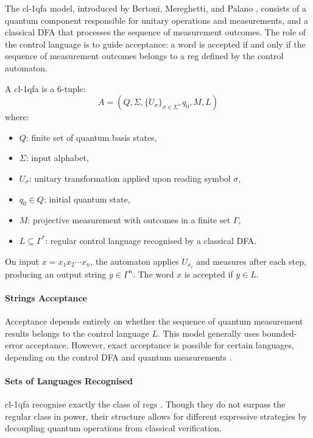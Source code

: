   
The \gls{cl-1qfa} model, introduced by Bertoni, Mereghetti, and Palano \cite{mereghetti2006quantum}, consists of a quantum component responsible for unitary operations and measurements, and a classical DFA that processes the sequence of measurement outcomes. The role of the control language is to guide acceptance: a word is accepted if and only if the sequence of measurement outcomes belongs to a \gls{reg} defined by the control automaton.

\begin{definition}
A \gls{cl-1qfa} is a 6-tuple:
\[
A = (Q, \Sigma, \{U_\sigma\}_{\sigma \in \Sigma}, q_0, M, L)
\]
where:
\begin{itemize}
    \item $Q$: finite set of quantum basis states,
    \item $\Sigma$: input alphabet,
    \item $U_\sigma$: unitary transformation applied upon reading symbol $\sigma$,
    \item $q_0 \in Q$: initial quantum state,
    \item $M$: projective measurement with outcomes in a finite set $\Gamma$,
    \item $L \subseteq \Gamma^*$: regular control language recognised by a classical DFA.
\end{itemize}
\end{definition}
On input $x = x_1x_2\cdots x_n$, the automaton applies $U_{x_i}$ and measures after each step, producing an output string $y \in \Gamma^n$. The word $x$ is accepted if $y \in L$.

\paragraph{Strings Acceptance}  
Acceptance depends entirely on whether the sequence of quantum measurement results belongs to the control language $L$. This model generally uses bounded-error acceptance. However, exact acceptance is possible for certain languages, depending on the control DFA and quantum measurements \cite{mereghetti2006quantum}.

\paragraph{Sets of Languages Recognised}  
\gls{cl-1qfa} recognise exactly the class of \glspl{reg} \cite{li2015hybrid}. Though they do not surpass the regular class in power, their structure allows for different expressive strategies by decoupling quantum operations from classical verification.

